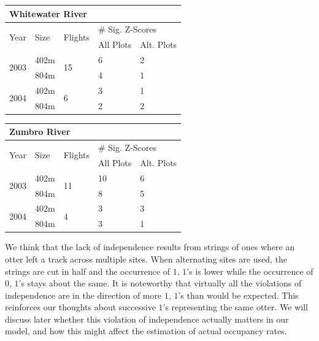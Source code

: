 \documentclass[12pt]{article}
\begin{document}
    \begin{center}
    \begin{tabular}{|l|l|l|l|l|}
        \hline
        \multicolumn{5}{|l|}{\textbf{Whitewater River}} \\
        \hline
        \multirow{2}{*}{Year} & \multirow{2}{*}{Size} & \multirow{2}{*}{Flights}
        & \multicolumn{2}{|l|}{\# Sig. Z-Scores} \\
        \cline{4-5}
        & & & All Plots & Alt. Plots \\
        \hline
        \multirow{2}{*}{2003} & 402m & \multirow{2}{*}{15} & 6 & 2 \\
        \cline{2-2} \cline{4-5}
        & 804m & & 4 & 1 \\
        \hline
        \multirow{2}{*}{2004} & 402m & \multirow{2}{*}{6} & 3 & 1 \\
        \cline{2-2} \cline{4-5}
        & 804m & & 2 & 2 \\
        \hline
    \end{tabular}
    \end{center}

    \begin{center}
    \begin{tabular}{|l|l|l|l|l|}
        \hline
        \multicolumn{5}{|l|}{\textbf{Zumbro River}} \\
        \hline
        \multirow{2}{*}{Year} & \multirow{2}{*}{Size} & \multirow{2}{*}{Flights}
        & \multicolumn{2}{|l|}{\# Sig. Z-Scores} \\
        \cline{4-5}
        & & & All Plots & Alt. Plots \\
        \hline
        \multirow{2}{*}{2003} & 402m & \multirow{2}{*}{11} & 10 & 6 \\
        \cline{2-2} \cline{4-5}
        & 804m & & 8 & 5 \\
        \hline
        \multirow{2}{*}{2004} & 402m & \multirow{2}{*}{4} & 3 & 3 \\
        \cline{2-2} \cline{4-5}
        & 804m & & 3 & 1 \\
        \hline
    \end{tabular}
    \end{center}

    We think that the lack of independence results from strings of ones where an
    otter left a track across multiple sites. When alternating sites are used,
    the strings are cut in half and the occurrence of \(1\), \(1\)'s is lower
    while the occurrence of \(0\), \(1\)'s stays about the same. It is
    noteworthy that virtually all the violations of independence are in the
    direction of more \(1\), \(1\)'s than would be expected. This reinforces our
    thoughts about successive \(1\)'s representing the same otter. We will
    discuss later whether this violation of independence actually matters in our
    model, and how this might affect the estimation of actual occupancy rates.
\end{document}
